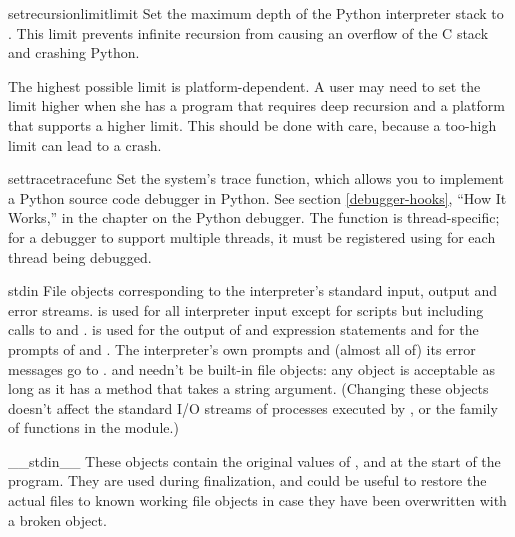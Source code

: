 \begin{funcdesc}{setrecursionlimit}{limit}
  Set the maximum depth of the Python interpreter stack to
  .  This limit prevents infinite recursion from causing an
  overflow of the C stack and crashing Python.

  The highest possible limit is platform-dependent.  A user may need
  to set the limit higher when she has a program that requires deep
  recursion and a platform that supports a higher limit.  This should
  be done with care, because a too-high limit can lead to a crash.
\end{funcdesc}

\begin{funcdesc}{settrace}{tracefunc}
  Set the system's trace function, which allows
  you to implement a Python source code debugger in Python.  See
  section \ref{debugger-hooks}, ``How It Works,'' in the chapter on
  the Python debugger.  The function is
  thread-specific; for a debugger to support multiple threads, it must
  be registered using  for each thread being
  debugged.
\end{funcdesc}

\begin{datadesc}{stdin}
  File objects corresponding to the interpreter's standard input,
  output and error streams.   is used for all interpreter
  input except for scripts but including calls to
   and
  .   is
  used for the output of  and expression statements and
  for the prompts of  and .
  The interpreter's own prompts and (almost all of) its error messages
  go to .   and  needn't be
  built-in file objects: any object is acceptable as long as it has a
   method that takes a string argument.  (Changing
  these objects doesn't affect the standard I/O streams of processes
  executed by ,  or the
   family of functions in the 
  module.)
\end{datadesc}

\begin{datadesc}{__stdin__}
  These objects contain the original values of ,
   and  at the start of the program.  They
  are used during finalization, and could be useful to restore the
  actual files to known working file objects in case they have been
  overwritten with a broken object.
\end{datadesc}

